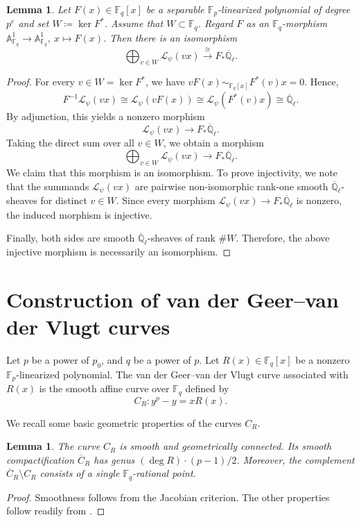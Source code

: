 \documentclass[12pt,a4paper]{amsart}
\newtheorem{lemma}[theorem]{Lemma}
\theoremstyle{definition}
\def\A{{\mathbb A}}
\def\F{{\mathbb F}}
\def\Ql{\overline{\mathbb{Q}}_\ell}
\theoremstyle{remark}
\begin{document}
\begin{lemma}\label{fpush}
Let $F(x) \in \F_q[x]$ be a separable $\F_p$-linearized polynomial of degree $p^e$ and set 
$W \coloneqq \ker F^\ast$. Assume that $W \subset \F_q$. 
Regard $F$ as an $\F_q$-morphism $\A^1_{\F_q}\to \A^1_{\F_q},\ x \mapsto F(x)$. 
Then there is an isomorphism 
\[
\bigoplus_{v \in W} 
\mathcal{L}_{\psi}(vx) \xrightarrow{\cong}
F_{\ast} \Ql. 
\]
\end{lemma}
\begin{proof}
For every $v \in W=\ker F^\ast$, we have 
$vF(x) \sim_{\F_q[x]} F^\ast(v)x=0$. 
Hence, 
\[
F^{-1}\mathcal{L}_{\psi}(vx)
\cong \mathcal{L}_{\psi}(vF(x)) 
\cong \mathcal{L}_{\psi}(F^\ast(v)x) 
\cong \Ql. 
\]
By adjunction, this yields a nonzero morphism 
\[
\mathcal{L}_{\psi}(vx) \to F_{\ast}\Ql.
\]
Taking the direct sum over all $v \in W$, we obtain a morphism
\[
\bigoplus_{v \in W} \mathcal{L}_{\psi}(vx) \to F_{\ast} \Ql.
\]
We claim that this morphism is an isomorphism. 
To prove injectivity, we note that the summands 
$\mathcal{L}_{\psi}(vx)$ are pairwise non-isomorphic rank-one smooth 
$\Ql$-sheaves for distinct $v \in W$. Since every morphism $\mathcal{L}_{\psi}(vx) \to F_{\ast} \Ql$ is nonzero, the induced morphism is injective. 



Finally, both sides are smooth $\Ql$-sheaves of rank $\#W$. Therefore,  the above injective morphism is necessarily an isomorphism.
\end{proof}

\section{Construction of van der Geer--van der Vlugt curves}
Let $p$ be a power of $p_0$, and $q$ be a power of $p$. Let $R(x)\in \F_q[x]$ be a nonzero $\F_p$-linearized polynomial. The van der Geer--van der Vlugt curve associated with $R(x)$ is the smooth affine curve over $\F_q$ defined by 
\[
C_R\colon y^p-y=xR(x). 
\]

We recall some basic geometric properties of the curves $C_{R}$. 
\begin{lemma}\label{lem: geometric properties of CRs}
   The curve $C_{R}$  is smooth and geometrically connected. Its smooth  compactification $\overline{C}_{R}$ has genus $(\deg R) \cdot (p-1)/2$. 
Moreover, the complement $\overline{C}_{R}\setminus C_{R}$ consists of a single $\F_q$-rational point.  
\end{lemma}
\begin{proof}
    Smoothness follows from the Jacobian criterion. The other properties follow readily from \cite[Proposition 6.4.1]{St}. 
\end{proof}
\end{document}
